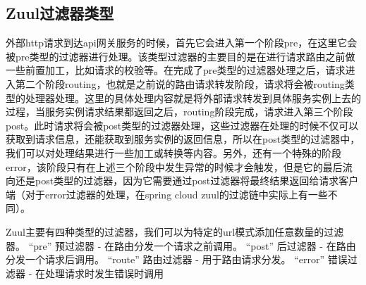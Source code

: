 \documentclass[../../../interview-questions.tex]{subfiles}
\begin{document}
\subsection{Zuul过滤器类型}

外部http请求到达api网关服务的时候，首先它会进入第一个阶段pre，在这里它会被pre类型的过滤器进行处理。该类型过滤器的主要目的是在进行请求路由之前做一些前置加工，比如请求的校验等。在完成了pre类型的过滤器处理之后，请求进入第二个阶段routing，也就是之前说的路由请求转发阶段，请求将会被routing类型的处理器处理。这里的具体处理内容就是将外部请求转发到具体服务实例上去的过程，当服务实例请求结果都返回之后，routing阶段完成，请求进入第三个阶段post。此时请求将会被post类型的过滤器处理，这些过滤器在处理的时候不仅可以获取到请求信息，还能获取到服务实例的返回信息，所以在post类型的过滤器中，我们可以对处理结果进行一些加工或转换等内容。另外，还有一个特殊的阶段error，该阶段只有在上述三个阶段中发生异常的时候才会触发，但是它的最后流向还是post类型的过滤器，因为它需要通过post过滤器将最终结果返回给请求客户端（对于error过滤器的处理，在spring cloud zuul的过滤链中实际上有一些不同）。

Zuul主要有四种类型的过滤器，我们可以为特定的url模式添加任意数量的过滤器。
“pre” 预过滤器 - 在路由分发一个请求之前调用。
“post” 后过滤器 - 在路由分发一个请求后调用。
“route” 路由过滤器 - 用于路由请求分发。
“error” 错误过滤器 - 在处理请求时发生错误时调用
\end{document}
